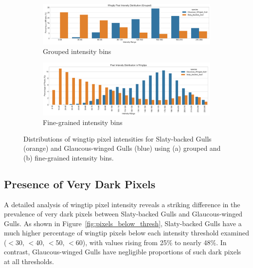\documentclass[a4paper,12pt]{report}
\begin{document}
\begin{figure}[H]
    \centering
    \begin{subfigure}[b]{0.47\textwidth}
        \includegraphics[width=\textwidth]{images/REPORT_IMAGES_INTENSITY/I2/intensitydistribution.png}
        \caption{Grouped intensity bins}
        \label{fig:wingtip_intensity_distribution_grouped}
    \end{subfigure}
    \hfill
    \begin{subfigure}[b]{0.47\textwidth}
        \includegraphics[width=\textwidth]{images/REPORT_IMAGES_INTENSITY/I2/TIPdistribution.png}
        \caption{Fine-grained intensity bins}
        \label{fig:wingtip_intensity_distribution_fine}
    \end{subfigure}
    \caption{Distributions of wingtip pixel intensities for Slaty-backed Gulls (orange) and Glaucous-winged Gulls (blue) using (a) grouped and (b) fine-grained intensity bins.}
    \label{fig:wingtip_intensity_distributions}
\end{figure}

\subsection{Presence of Very Dark Pixels}

A detailed analysis of wingtip pixel intensity reveals a striking difference in the prevalence of very dark pixels between Slaty-backed Gulls and Glaucous-winged Gulls. As shown in Figure~\ref{fig:pixels_below_thresh}, Slaty-backed Gulls have a much higher percentage of wingtip pixels below each intensity threshold examined ($<$30, $<$40, $<$50, $<$60), with values rising from 25\% to nearly 48\%. In contrast, Glaucous-winged Gulls have negligible proportions of such dark pixels at all thresholds.
\end{document}
